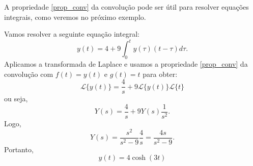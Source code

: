 A propriedade \ref{prop_conv} da convolução pode ser útil para resolver equações integrais, como veremos no próximo exemplo.
 \begin{ex} Vamos resolver a seguinte equação integral:
 \begin{equation}
 y(t)=4+9\int_0^t y(\tau)(t-\tau)d\tau.
 \end{equation}
 Aplicamos a transformada de Laplace e usamos a propriedade \ref{prop_conv} da convolução com $f(t)=y(t)$ e $g(t)=t$ para obter:
 \begin{equation}
 \mathcal{L}\{y(t)\}=\frac{4}{s}+9\mathcal{L}\{y(t)\}\mathcal{L}\{t\}
 \end{equation}
 ou seja,
 \begin{equation}
 Y(s)=\frac{4}{s}+9Y(s)\frac{1}{s^2}.
 \end{equation}
 Logo,
 \begin{equation}
 Y(s)=\frac{s^2}{s^2-9}\frac{4}{s}=\frac{4s}{s^2-9}.
 \end{equation}
 Portanto,
 \begin{equation}
 y(t)=4\cosh(3t)
 \end{equation}
\end{ex}


